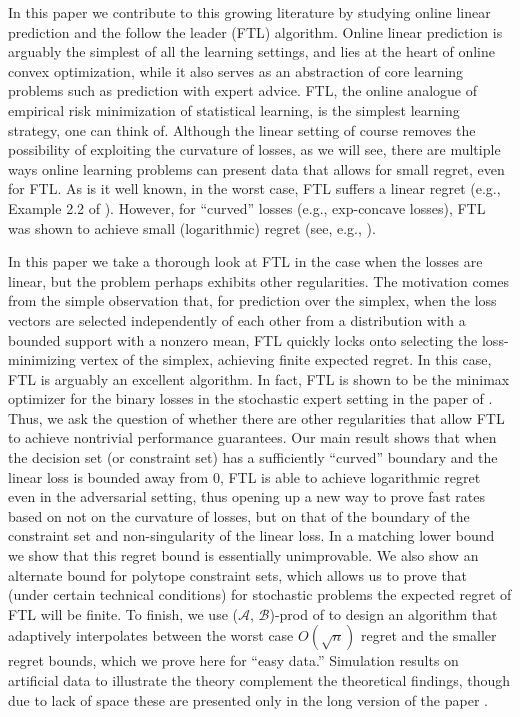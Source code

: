 \documentclass[english]{article}
\newcommand{\cA}{\mathcal{A}}
\newcommand{\cB}{\mathcal{B}}
\begin{document}
In this paper we contribute to this growing literature by studying online linear prediction and the follow the leader (FTL) algorithm.
Online linear prediction is arguably the simplest of all the learning settings, and lies at the heart of online
convex optimization, while it also serves as an abstraction of core learning problems such as prediction with expert advice.
FTL, the online analogue of empirical risk minimization of statistical learning, is the simplest learning strategy, one can think of.
Although the linear setting of course removes the possibility of exploiting the curvature of losses, as we will see, there are
multiple ways online learning problems can present data that allows for small regret, even for FTL.
As is it well known, in the worst case,
FTL suffers a linear regret (e.g., Example 2.2 of \citet{SS12:Book}). 
However, for ``curved'' losses (e.g., exp-concave losses), FTL was shown to achieve small (logarithmic) regret
(see, e.g., \citet{MF92,CBLu06:book,gaivoronski2000stochastic,hazan2007logarithmic}).

In this paper we take a thorough look at FTL in the case when the losses are linear, 
but the problem perhaps exhibits other regularities.
The motivation comes from the simple observation that, for prediction over the simplex, when
the loss vectors are selected independently of each other from a distribution with a bounded support with a
nonzero mean, FTL quickly locks onto selecting the loss-minimizing vertex of the simplex, achieving finite expected regret.
In this case, FTL is arguably an excellent algorithm.
In fact, FTL is shown to be the minimax optimizer for the binary losses in the  stochastic expert setting in the paper of \citet{kotlowskiminimax}.
Thus, we ask the question of whether there are other regularities that allow FTL 
to achieve nontrivial performance guarantees.
Our main result shows that when the decision set (or constraint set) has a sufficiently ``curved'' boundary and the linear loss is bounded away from $0$, FTL 
is able to achieve logarithmic regret even in the adversarial setting, thus opening up a new
way to prove fast rates based on not on the curvature of losses, but on that of the boundary of the constraint set and non-singularity of the linear loss.
In a matching lower bound we show that this regret bound is essentially unimprovable.
We also show an alternate bound for polytope constraint sets, which allows us to prove that 
(under certain technical conditions) for stochastic problems the expected regret of FTL will be finite.
To finish, we use ($\cA$, $\cB$)-prod of \citet{sani2014exploiting} to design an algorithm 
that adaptively interpolates between the worst case $O(\sqrt{n})$ regret and the smaller regret bounds,
which we prove here for ``easy data.'' Simulation results on artificial data to illustrate the theory complement
the theoretical findings, though due to lack of space these are presented only in the long version of the paper \citep{huang16long}. %
\end{document}
